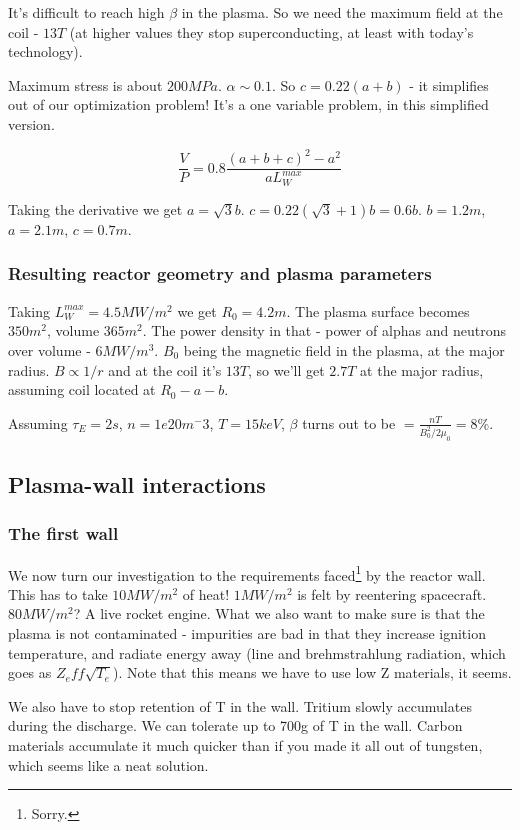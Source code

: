 \documentclass[PlasmaNotes.tex]{subfiles}
\begin{document}
It's difficult to reach high $\beta$ in the plasma. So we need the maximum field at the coil - $13 T$ (at higher values they stop superconducting, at least with today's technology).

Maximum stress is about $200 MPa$. $\alpha \sim 0.1$. So $c=0.22(a+b)$ - it simplifies out of our optimization problem! It's a one variable problem, in this simplified version.

\[
 \frac{V}{P} = 0.8 \frac{(a+b+c)^2-a^2}{a L_W^{max}}
\]

Taking the derivative we get $a=\sqrt{3} b$. $c=0.22(\sqrt{3}+1)b=0.6b$. $b=1.2m$, $a=2.1m$, $c=0.7m$.

\subsubsection{Resulting reactor geometry and plasma parameters}

Taking $L_W^{max} = 4.5 MW/m^2$ we get $R_0 = 4.2m$. The plasma surface becomes $350m^2$, volume $365m^2$. The power density in that - power of alphas and neutrons over volume - $6 MW/m^3$. $B_0$ being the magnetic field in the plasma, at the major radius. $B \propto 1/r$ and at the coil it's $13 T$, so we'll get $2.7 T$ at the major radius, assuming coil located at $R_0-a-b$.

Assuming $\tau_E = 2s$, $n=1e20 m^-3$, $T=15 keV$, $\beta$ turns out to be $= \frac{n T}{B_0^2/2\mu_0} = 8\%$.

\subsection{Plasma-wall interactions}

\subsubsection{The first wall}

We now turn our investigation to the requirements faced\footnote{Sorry.} by the reactor wall. This has to take $10MW/m^2$ of heat! $1MW/m^2$ is felt by reentering spacecraft. $80MW/m^2$? A live rocket engine. What we also want to make sure is that the plasma is not contaminated - impurities are bad in that they increase ignition temperature, and radiate energy away (line and brehmstrahlung radiation, which goes as $Z_eff \sqrt{T_e}$). Note that this means we have to use low Z materials, it seems.

We also have to stop retention of T in the wall. Tritium slowly accumulates during the discharge. We can tolerate up to 700g of T in the wall. Carbon materials accumulate it much quicker than if you made it all out of tungsten, which seems like a neat solution.
\end{document}
